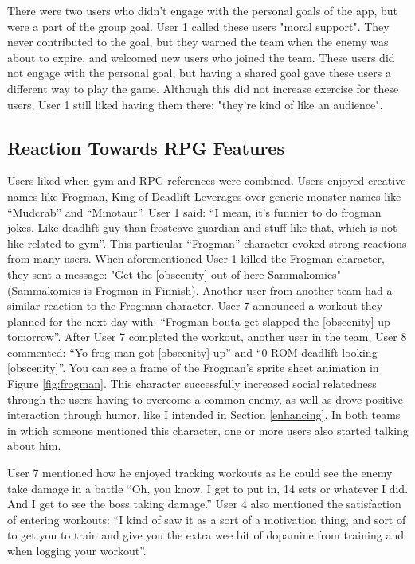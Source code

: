 \documentclass{l4proj}
\begin{document}
There were two users who didn't engage with the personal goals of the app, but were a part of the group goal. User 1 called these users "moral support". They never contributed to the goal, but they warned the team when the enemy was about to expire, and welcomed new users who joined the team. These users did not engage with the personal goal, but having a shared goal gave these users a different way to play the game. Although this did not increase exercise for these users, User 1 still liked having them there: "they're kind of like an audience". 

\subsection{Reaction Towards RPG Features}
Users liked when gym and RPG references were combined. Users enjoyed creative names like Frogman, King of Deadlift Leverages over generic monster names like ``Mudcrab'' and ``Minotaur''. User 1 said: ``I mean, it's funnier to do frogman jokes. Like deadlift guy than frostcave guardian and stuff like that, which is not like related to gym''. This particular ``Frogman'' character evoked strong reactions from many users. When aforementioned User 1 killed the Frogman character, they sent a message: "Get the [obscenity] out of here Sammakomies" (Sammakomies is Frogman in Finnish). Another user from another team had a similar reaction to the Frogman character. User 7 announced a workout they planned for the next day with: ``Frogman bouta get slapped the [obscenity] up tomorrow''. After User 7 completed the workout, another user in the team, User 8 commented: ``Yo frog man got [obscenity] up'' and ``0 ROM deadlift looking [obscenity]''.  You can see a frame of the Frogman's sprite sheet animation in Figure \ref{fig:frogman}. This character successfully increased social relatedness through the users having to overcome a common enemy, as well as drove positive interaction through humor, like I intended in Section \ref{enhancing}. In both teams in which someone mentioned this character, one or more users also started talking about him.

User 7 mentioned how he enjoyed tracking workouts as he could see the enemy take damage in a battle ``Oh, you know, I get to put in, 14 sets or whatever I did. And I get to see the boss taking damage.'' User 4 also mentioned the satisfaction of entering workouts: ``I kind of saw it as a sort of a motivation thing, and sort of to get you to train and give you the extra wee bit of dopamine from training and when logging your workout''.
\end{document}
